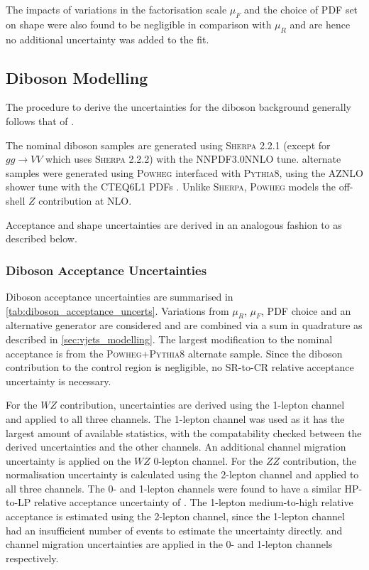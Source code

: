 The impacts of variations in the factorisation scale $\mu_{F}$ and the choice of PDF set on \mJ shape were also found to be negligible in comparison with $\mu_{R}$ and are hence no additional uncertainty was added to the fit.


\subsection{Diboson Modelling}\label{sec:diboson_modelling}

The procedure to derive the uncertainties for the diboson background generally follows that of \Vjets.

The nominal diboson samples are generated using \textsc{Sherpa} 2.2.1 (except for $gg\rightarrow VV$ which uses \textsc{Sherpa} 2.2.2) with the NNPDF3.0NNLO tune.
alternate samples were generated using \textsc{Powheg} interfaced with \textsc{Pythia8}, using the AZNLO shower tune with the CTEQ6L1 PDFs \cite{Pumplin:2002:CTEQ6L1}.
Unlike \textsc{Sherpa}, \textsc{Powheg} models the off-shell $Z$ contribution at NLO.

Acceptance and shape uncertainties are derived in an analogous fashion to \Vjets as described below.

\subsubsection{Diboson Acceptance Uncertainties}

Diboson acceptance uncertainties are summarised in \cref{tab:diboson_acceptance_uncerts}.
Variations from $\mu_R$, $\mu_F$, PDF choice and an alternative generator are considered and are combined via a sum in quadrature as described in \cref{sec:vjets_modelling}.
The largest modification to the nominal acceptance is from the \textsc{Powheg+Pythia8} alternate sample.
Since the diboson contribution to the \ttbar control region is negligible, no SR-to-CR relative acceptance uncertainty is necessary.

For the $WZ$ contribution, uncertainties are derived using the 1-lepton channel and applied to all three channels.
The 1-lepton channel was used as it has the largest amount of available statistics, with the compatability checked between the derived uncertainties and the other channels.
An additional  channel migration uncertainty is applied on the $WZ$ 0-lepton channel.
For the $ZZ$ contribution, the normalisation uncertainty is calculated using the 2-lepton channel and applied to all three channels.
The 0- and 1-lepton channels were found to have a similar HP-to-LP relative acceptance uncertainty of .
The 1-lepton medium-to-high \ptv relative acceptance is estimated using the 2-lepton channel, since the 1-lepton channel had an insufficient number of events to estimate the uncertainty directly.
 and  channel migration uncertainties are applied in the 0- and 1-lepton channels respectively.

